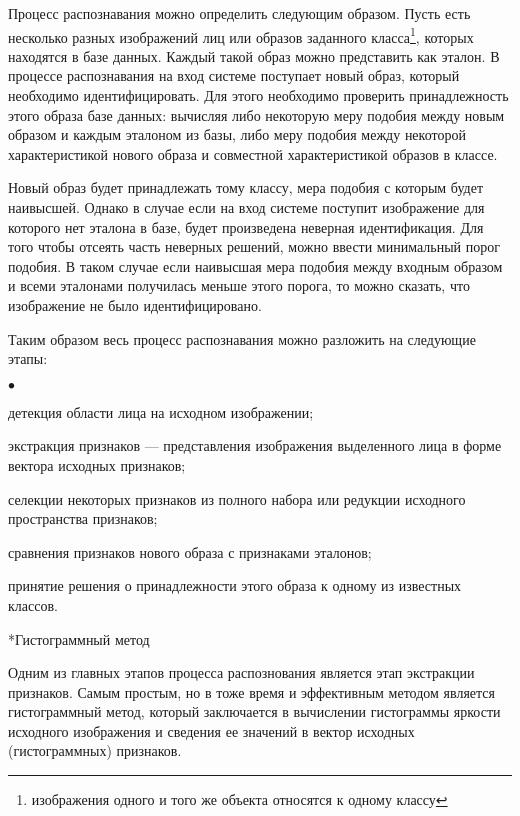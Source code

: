 \documentclass[a4paper,12pt,titlpage]{posobie}
\makeatletter
\newcommand{\MarkDot}{{$\bullet$}} %
\newenvironment{dotlist}%
    {\begin{list}{\MarkDot}{\partopsep=0mm\itemsep=0mm\topsep=0mm\parsep=0mm\partopsep=0mm\parskip=0mm}}%
    {\end{list}}
\renewcommand{\section}{\@startsection{section}{1}{0.0cm}{0.5cm}{0.1cm}%
             {\fontsize{16}{16}\bf\selectfont }}
\makeatother
\begin{document}
    Процесс распознавания можно определить следующим образом. Пусть есть несколько разных изображений лиц 
или образов заданного класса\footnote{изображения одного и того же объекта относятся к одному классу}, которых находятся в базе 
данных. Каждый такой образ можно представить как эталон. В процессе распознавания на вход системе поступает новый образ, 
который необходимо идентифицировать. Для этого необходимо проверить принадлежность этого образа базе данных: вычисляя
либо некоторую меру подобия между новым образом и каждым эталоном из базы, либо меру подобия между некоторой характеристикой
нового образа и совместной характеристикой образов в классе.

     Новый образ будет принадлежать тому классу, мера подобия с которым будет наивысшей. Однако в случае если на вход системе
поступит изображение для которого нет эталона в базе, будет произведена неверная идентификация. Для того чтобы отсеять часть неверных 
решений, можно ввести минимальный порог подобия. В таком случае если наивысшая мера подобия между входным образом и всеми эталонами
получилась меньше этого порога, то можно сказать, что изображение не было идентифицировано. 

Таким образом весь процесс распознавания можно разложить на следующие этапы:
\begin{dotlist}
\item детекция области лица на исходном изображении;
\item экстракция признаков --- представления изображения выделенного лица в форме вектора исходных признаков;
\item селекции некоторых признаков из полного набора или редукции исходного пространства признаков;
\item сравнения признаков нового образа с признаками эталонов;
\item принятие решения о принадлежности этого образа к одному из известных классов.
\end{dotlist}

\section*{Гистограммный метод}
     Одним из главных этапов процесса распознования является этап экстракции признаков. Самым простым, но в тоже время
и эффективным методом является гистограммный метод, который заключается в вычислении гистограммы яркости исходного изображения и 
сведения ее значений в вектор исходных (гистограммных) признаков. 
\end{document}
